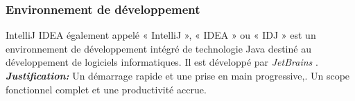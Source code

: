 \documentclass[a4paper]{report}
\begin{document}
\begin{spacing}{2}
\subsubsection{Environnement de  développement}
\begin{minipage}{0.2\textwidth}
	\begin{minipage}{\linewidth}
	\end{minipage}
\end{minipage}
\hfill
\begin{minipage}{0.75\textwidth}
	IntelliJ IDEA également appelé « IntelliJ », « IDEA » ou « IDJ » est un environnement de développement intégré de technologie Java destiné au développement de logiciels informatiques. Il est développé par \textit{JetBrains} .\\
	\textbf{\textit{Justification:}} Un démarrage rapide et une prise en main progressive,. Un scope fonctionnel complet et une productivité accrue.\\
\end{minipage}\\

\end{spacing}
\end{document}
